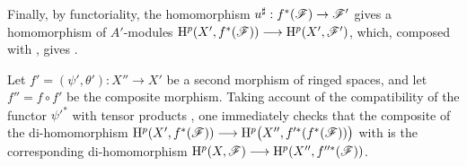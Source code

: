 \begin{env}[12.1.3]
Finally, by functoriality, the homomorphism
$u^\sharp:f^*(\mathscr{F})\to\mathscr{F}'$ gives a homomorphism of
$A'$-modules $\mathrm{H}^p(X',f^*(\mathscr{F}))
\longrightarrow
\mathrm{H}^p(X',\mathscr{F}')$,
which, composed with , gives
.

Let $f'=(\psi',\theta'):X''\to X'$ be a second morphism of ringed
spaces, and let $f''=f\circ f'$ be the composite morphism.
Taking account of the compatibility of the functor $\psi'^*$ with
tensor products , one immediately
checks that the composite of the di-homomorphism $\mathrm{H}^p(X',f^*(\mathscr{F}))
\longrightarrow
\mathrm{H}^p\bigl(X'',f'^*(f^*(\mathscr{F}))\bigr)$
with  is the corresponding di-homomorphism $\mathrm{H}^p(X,\mathscr{F})
\longrightarrow
\mathrm{H}^p(X'',f''^*(\mathscr{F}))$.
\end{env}

